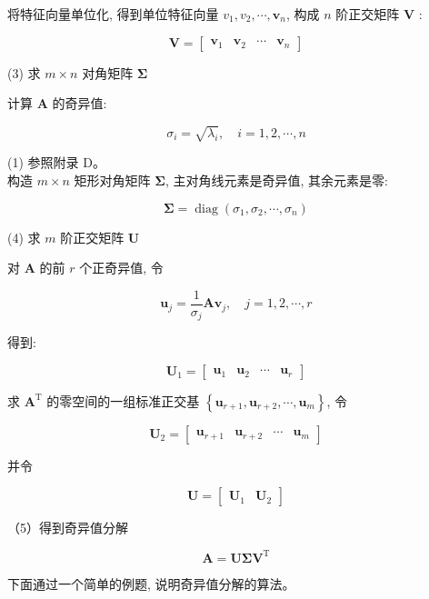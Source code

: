 \documentclass[10pt]{article}
\begin{document}
将特征向量单位化, 得到单位特征向量 $v_{1}, v_{2}, \cdots, \boldsymbol{v}_{n}$, 构成 $n$ 阶正交矩阵 $\boldsymbol{V}$ :

$$
\boldsymbol{V}=\left[\begin{array}{llll}
\boldsymbol{v}_{1} & \boldsymbol{v}_{2} & \cdots & \boldsymbol{v}_{n}
\end{array}\right]
$$

(3) 求 $m \times n$ 对角矩阵 $\boldsymbol{\Sigma}$

计算 $\boldsymbol{A}$ 的奇异值:

$$
\sigma_{i}=\sqrt{\lambda_{i}}, \quad i=1,2, \cdots, n
$$

(1) 参照附录 D。\\
构造 $m \times n$ 矩形对角矩阵 $\boldsymbol{\Sigma}$, 主对角线元素是奇异值, 其余元素是零:

$$
\boldsymbol{\Sigma}=\operatorname{diag}\left(\sigma_{1}, \sigma_{2}, \cdots, \sigma_{n}\right)
$$

(4) 求 $m$ 阶正交矩阵 $\boldsymbol{U}$

对 $\boldsymbol{A}$ 的前 $r$ 个正奇异值, 令

$$
\boldsymbol{u}_{j}=\frac{1}{\sigma_{j}} \boldsymbol{A} \boldsymbol{v}_{j}, \quad j=1,2, \cdots, r
$$

得到:

$$
\boldsymbol{U}_{1}=\left[\begin{array}{llll}
\boldsymbol{u}_{1} & \boldsymbol{u}_{2} & \cdots & \boldsymbol{u}_{r}
\end{array}\right]
$$

求 $\boldsymbol{A}^{\mathrm{T}}$ 的零空间的一组标准正交基 $\left\{\boldsymbol{u}_{r+1}, \boldsymbol{u}_{r+2}, \cdots, \boldsymbol{u}_{m}\right\}$, 令

$$
\boldsymbol{U}_{2}=\left[\begin{array}{llll}
\boldsymbol{u}_{r+1} & \boldsymbol{u}_{r+2} & \cdots & \boldsymbol{u}_{m}
\end{array}\right]
$$

并令

$$
\boldsymbol{U}=\left[\begin{array}{ll}
\boldsymbol{U}_{1} & \boldsymbol{U}_{2}
\end{array}\right]
$$

（5）得到奇异值分解

$$
\boldsymbol{A}=\boldsymbol{U} \boldsymbol{\Sigma} \boldsymbol{V}^{\mathrm{T}}
$$

下面通过一个简单的例题, 说明奇异值分解的算法。
\end{document}
